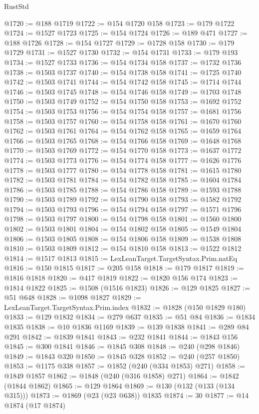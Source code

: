 \begin{lexlean}{RustStd}
\begin{coremodule}
@1720 := @188 @1719
@1722 := @154 @1720 @158
@1723 := @179 @1722
@1724 := @1527 @1723
@1725 := @154 @1724
@1726 := @189 @471
@1727 := @188 @1726
@1728 := @154 @1727
@1729 := @1728 @158
@1730 := @179 @1729
@1731 := @1527 @1730
@1732 := @154 @1731
@1733 := @179 @193
@1734 := @1527 @1733
@1736 := @154 @1734 @158
@1737 := @1732 @1736
@1738 := @1503 @1737
@1740 := @154 @1738 @158
@1741 := @1725 @1740
@1742 := @1503 @1741
@1744 := @154 @1742 @158
@1745 := @1714 @1744
@1746 := @1503 @1745
@1748 := @154 @1746 @158
@1749 := @1703 @1748
@1750 := @1503 @1749
@1752 := @154 @1750 @158
@1753 := @1692 @1752
@1754 := @1503 @1753
@1756 := @154 @1754 @158
@1757 := @1681 @1756
@1758 := @1503 @1757
@1760 := @154 @1758 @158
@1761 := @1670 @1760
@1762 := @1503 @1761
@1764 := @154 @1762 @158
@1765 := @1659 @1764
@1766 := @1503 @1765
@1768 := @154 @1766 @158
@1769 := @1648 @1768
@1770 := @1503 @1769
@1772 := @154 @1770 @158
@1773 := @1637 @1772
@1774 := @1503 @1773
@1776 := @154 @1774 @158
@1777 := @1626 @1776
@1778 := @1503 @1777
@1780 := @154 @1778 @158
@1781 := @1615 @1780
@1782 := @1503 @1781
@1784 := @154 @1782 @158
@1785 := @1604 @1784
@1786 := @1503 @1785
@1788 := @154 @1786 @158
@1789 := @1593 @1788
@1790 := @1503 @1789
@1792 := @154 @1790 @158
@1793 := @1582 @1792
@1794 := @1503 @1793
@1796 := @154 @1794 @158
@1797 := @1571 @1796
@1798 := @1503 @1797
@1800 := @154 @1798 @158
@1801 := @1560 @1800
@1802 := @1503 @1801
@1804 := @154 @1802 @158
@1805 := @1549 @1804
@1806 := @1503 @1805
@1808 := @154 @1806 @158
@1809 := @1538 @1808
@1810 := @1503 @1809
@1812 := @154 @1810 @158
@1813 := @1522 @1812
@1814 := @1517 @1813
@1815 := LexLeanTarget.TargetSyntax.Prim.natEq
@1816 := @150 @1815
@1817 := @205 @158
@1818 := @179 @1817
@1819 := @1816 @1818
@1820 := @417 @1819
@1822 := @1820 @156 @174
@1823 := @1814 @1822
@1825 := @1508 (@1516 @1823)
@1826 := @129 @1825
@1827 := @51 @648
@1828 := @1098 @1827
@1829 := LexLeanTarget.TargetSyntax.Prim.index
@1832 := @1828 (@150 @1829 @180)
@1833 := @129 @1832
@1834 := @279 @637
@1835 := @51 @84
@1836 := @1834 @1835
@1838 := @10 @1836 @1169
@1839 := @139 @1838
@1841 := @289 @84 @291
@1842 := @1839 @1841
@1843 := @232 @1841
@1844 := @1843 @156
@1845 := @300 @1841
@1846 := @1845 @308
@1848 := @240 (@298 @1846)
@1849 := @1843 @320
@1850 := @1845 @328
@1852 := @240 (@257 @1850)
@1853 := @1175 @338
@1857 := @1852 (@240 (@334 @1853) @271)
@1858 := @1849 @1857
@1862 := @1848 (@240 (@316 @1858) @271)
@1864 := @1842 (@1844 @1862)
@1865 := @129 @1864
@1869 := @130 (@132 (@133 (@134 @315)))
@1873 := @1869 (@23 (@23 @638)) @1835
@1874 := 30
@1877 := @14 @1874 (@17 @1874)

\end{coremodule}
\end{lexlean}
